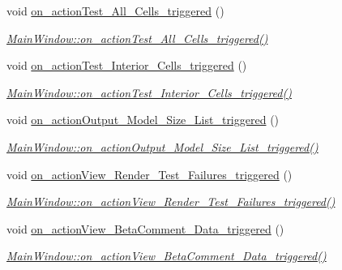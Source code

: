 \begin{DoxyCompactItemize}
void \hyperlink{class_main_window_a7ba69db7e0da3b95a98c3207deaabacb}{on\+\_\+action\+Test\+\_\+\+All\+\_\+\+Cells\+\_\+triggered} ()
\begin{DoxyCompactList}\small\item\em \hyperlink{class_main_window_a7ba69db7e0da3b95a98c3207deaabacb}{Main\+Window\+::on\+\_\+action\+Test\+\_\+\+All\+\_\+\+Cells\+\_\+triggered()} \end{DoxyCompactList}\item 
void \hyperlink{class_main_window_af1dd399ccee2cf368432256a4c8cfc36}{on\+\_\+action\+Test\+\_\+\+Interior\+\_\+\+Cells\+\_\+triggered} ()
\begin{DoxyCompactList}\small\item\em \hyperlink{class_main_window_af1dd399ccee2cf368432256a4c8cfc36}{Main\+Window\+::on\+\_\+action\+Test\+\_\+\+Interior\+\_\+\+Cells\+\_\+triggered()} \end{DoxyCompactList}\item 
void \hyperlink{class_main_window_a9f15c0cb032a4c6914806b0feac5ff9d}{on\+\_\+action\+Output\+\_\+\+Model\+\_\+\+Size\+\_\+\+List\+\_\+triggered} ()
\begin{DoxyCompactList}\small\item\em \hyperlink{class_main_window_a9f15c0cb032a4c6914806b0feac5ff9d}{Main\+Window\+::on\+\_\+action\+Output\+\_\+\+Model\+\_\+\+Size\+\_\+\+List\+\_\+triggered()} \end{DoxyCompactList}\item 
void \hyperlink{class_main_window_a0ffc9518de23f6fcc4b60286e5d70260}{on\+\_\+action\+View\+\_\+\+Render\+\_\+\+Test\+\_\+\+Failures\+\_\+triggered} ()
\begin{DoxyCompactList}\small\item\em \hyperlink{class_main_window_a0ffc9518de23f6fcc4b60286e5d70260}{Main\+Window\+::on\+\_\+action\+View\+\_\+\+Render\+\_\+\+Test\+\_\+\+Failures\+\_\+triggered()} \end{DoxyCompactList}\item 
void \hyperlink{class_main_window_a18145ab0d7747c6315778992ea38615a}{on\+\_\+action\+View\+\_\+\+Beta\+Comment\+\_\+\+Data\+\_\+triggered} ()
\begin{DoxyCompactList}\small\item\em \hyperlink{class_main_window_a18145ab0d7747c6315778992ea38615a}{Main\+Window\+::on\+\_\+action\+View\+\_\+\+Beta\+Comment\+\_\+\+Data\+\_\+triggered()} \end{DoxyCompactList}\item 

\end{DoxyCompactItemize}
